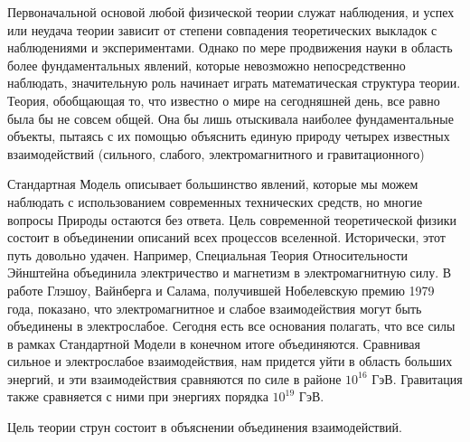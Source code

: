 Первоначальной основой любой физической теории служат наблюдения, 
и успех или неудача теории зависит от степени совпадения
теоретических выкладок с наблюдениями и экспериментами.
Однако по мере продвижения науки в область более фундаментальных явлений,
которые невозможно непосредственно наблюдать,
значительную роль начинает играть математическая структура теории.
Теория, обобщающая то, что известно о мире на сегодняшней день,
все равно была бы не совсем общей. Она бы лишь отыскивала наиболее фундаментальные объекты,
пытаясь с их помощью  объяснить единую природу четырех известных взаимодействий (сильного, слабого, электромагнитного и гравитационного)

Стандартная Модель описывает большинство явлений,
которые мы можем наблюдать с использованием современных технических средств,
но многие вопросы Природы остаются без ответа.
Цель современной теоретической физики состоит в объединении описаний всех процессов вселенной.
Исторически, этот путь довольно удачен. Например,
Специальная Теория Относительности Эйнштейна объединила электричество и магнетизм в электромагнитную силу.
В работе Глэшоу, Вайнберга и Салама, получившей Нобелевскую премию 1979 года, показано,
что электромагнитное и слабое взаимодействия могут быть объединены в электрослабое.
Сегодня есть все основания полагать, что все силы в рамках Стандартной Модели в конечном итоге объединяются.
Сравнивая сильное и электрослабое взаимодействия, нам придется уйти в область больших энергий,
и эти взаимодействия  сравняются по силе в районе $10^16$ ГэВ.
Гравитация также сравняется с ними при энергиях порядка $10^{19}$ ГэВ. 

Цель теории струн состоит в объяснении объединения взаимодействий.